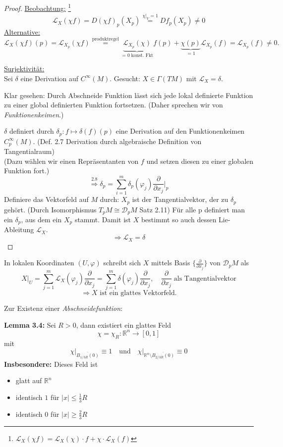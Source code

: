 \documentclass[fleqn, 12pt, letterpaper]{article}
\newcommand{\deldel}[2]{\frac{\partial #1}{\partial #2}}
\newcommand{\txt}[1]{\text{#1}}
\begin{document}
\begin{proof}
\underline{Beobachtung:} \footnote{\(\mathcal{L}_X(\chi f) = \mathcal{L}_X(\chi) \cdot f + \chi \cdot \mathcal{L}_X(f)\)}
\[
\mathcal{L}_X(\chi f) = D(\chi f)_p(X_p) \overset{\chi|_V=1 }{=} Df_p(X_p) \neq 0
\]
\underline{Alternative:}
\[
\mathcal{L}_X(\chi f)(p) = \mathcal{L}_{X_p}(\chi f) \overset{\txt{produktregel}}{=} \underbrace{\mathcal{L}_{X_p}(\chi)}_{=0 \;\txt{konst. Fkt}}f(p)+\underbrace{\chi(p)}_{=1} \mathcal{L}_{X_p}(f) = \mathcal{L}_{X_p}(f) \neq 0.
\]

\underline{Surjektivität:} \\
Sei \( \delta \) eine Derivation auf \( C^\infty(M) \). Gesucht: \( X \in \Gamma(TM) \) mit \( \mathcal{L}_X = \delta \).

\medskip

Klar gesehen: Durch Abschneide Funktion lässt sich jede lokal definierte Funktion zu einer global definierten Funktion fortsetzen. (Daher sprechen wir von \emph{Funktionenkeimen}.)

\medskip

\( \delta \) definiert durch \( \delta_p \colon f \mapsto \delta(f)(p) \) eine Derivation auf den Funktionenkeimen \( C^\infty_p(M) \). (Def. 2.7 Derivation durch algebraische Definition von Tangentialraum) \\
(Dazu wählen wir einen Repräsentanten von \( f \) und setzen diesen zu einer globalen Funktion fort.)
\[
\overset{2.8}{\Rightarrow} \delta_p = \sum_{i=1}^m \delta_p(\varphi_j) \frac{\partial}{\partial x_j}|_p
\]
Definiere das Vektorfeld auf \( M \) durch: \( X_p \) ist der Tangentialvektor, der zu \( \delta_p \) gehört. (Durch Isomorphismus $T_pM\cong \mathcal{D}_pM$ Satz 2.11) Für alle p definiert man ein $\delta_p$, aus dem ein $X_p$ stammt. Damit ist $X$ bestimmt so auch dessen Lie-Ableitung $\mathcal{L}_X$. 
\[
\Rightarrow \mathcal{L}_X = \delta
\]
\end{proof}
In lokalen Koordinaten \( (U, \varphi) \) schreibt sich \( X \) mittels Basis $\{\deldel{}{x_j}\}$ von $\mathcal{D}_pM$ als
\[
X|_U = \sum_{j=1}^m \mathcal{L}_X(\varphi_j)\deldel{}{x_j}= \sum_{j=1}^m \delta(\varphi_j)\deldel{}{x_j}, \quad \deldel{}{x_j}\;\txt{als Tangentialvektor}
\]
\[
\Rightarrow X \text{ ist ein glattes Vektorfeld.}
\]

Zur Existenz einer \emph{Abschneidefunktion}:

\medskip

\textbf{Lemma 3.4:}
Sei \( R > 0 \), dann existiert ein glattes Feld 
\[
\chi = \chi_R \colon \mathbb{R}^n \to [0,1]
\]
mit
\[
\chi \big|_{\overline{B_{1/3 R}(0)}} \equiv 1 \quad \text{und} \quad \chi \big|_{\mathbb{R}^n \setminus \overline{B_{2/3 R}(0)}} \equiv 0
\]
\textbf{Insbesondere:} Dieses Feld ist
\begin{itemize}
  \item glatt auf \( \mathbb{R}^n \)
  \item identisch \( 1 \) für \( |x| \leq \frac{1}{3} R \)
  \item identisch \( 0 \) für \( |x| \geq \frac{2}{3} R \)
\end{itemize}
\end{document}

